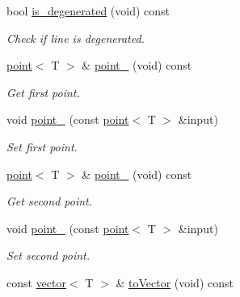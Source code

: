 \begin{DoxyCompactItemize}
\mbox{\label{classddd_1_1segment_a43155de100a751120bbad47048695212}} 
bool \hyperlink{classddd_1_1segment_a43155de100a751120bbad47048695212}{is\+\_\+degenerated} (void) const
\begin{DoxyCompactList}\small\item\em Check if line is degenerated. \end{DoxyCompactList}\item 
\mbox{\label{classddd_1_1segment_ae874518c4eeb83249839baac23687288}} 
\hyperlink{classddd_1_1point}{point}$<$ T $>$ \& \hyperlink{classddd_1_1segment_ae874518c4eeb83249839baac23687288}{point\+\_} (void) const
\begin{DoxyCompactList}\small\item\em Get first point. \end{DoxyCompactList}\item 
void \hyperlink{classddd_1_1segment_acb01f37ab6c2bf4313d627246ea97a56}{point\+\_} (const \hyperlink{classddd_1_1point}{point}$<$ T $>$ \&input)
\begin{DoxyCompactList}\small\item\em Set first point. \end{DoxyCompactList}\item 
\mbox{\label{classddd_1_1segment_a225b21518f2203a1c64a9ccd3904bb41}} 
\hyperlink{classddd_1_1point}{point}$<$ T $>$ \& \hyperlink{classddd_1_1segment_a225b21518f2203a1c64a9ccd3904bb41}{point\+\_} (void) const
\begin{DoxyCompactList}\small\item\em Get second point. \end{DoxyCompactList}\item 
void \hyperlink{classddd_1_1segment_a7b2abb8f44935ba3a72c663c75d802d3}{point\+\_} (const \hyperlink{classddd_1_1point}{point}$<$ T $>$ \&input)
\begin{DoxyCompactList}\small\item\em Set second point. \end{DoxyCompactList}\item 
\mbox{\label{classddd_1_1segment_ab49787592f80cedf871adf00d3e54f76}} 
const \hyperlink{classddd_1_1vector}{vector}$<$ T $>$ \& \hyperlink{classddd_1_1segment_ab49787592f80cedf871adf00d3e54f76}{to\+Vector} (void) const

\end{DoxyCompactItemize}
